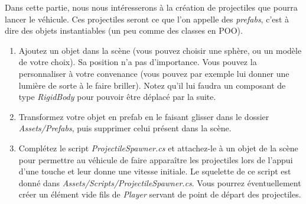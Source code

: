 Dans cette partie, nous nous intéresserons à la création de projectiles que pourra lancer le véhicule. Ces projectiles seront ce que l'on appelle des \textit{prefabs}, c'est à dire des objets instantiables (un peu comme des classes en POO).

\begin{enumerate}
\item Ajoutez un objet dans la scène (vous pouvez choisir une sphère, ou un modèle de votre choix). Sa position n'a pas d'importance. Vous pouvez la personnaliser à votre convenance (vous pouvez par exemple lui donner une lumière de sorte à le faire briller). Notez qu'il lui faudra un composant de type \textit{RigidBody} pour pouvoir être déplacé par la suite.
\item Transformez votre objet en prefab en le faisant glisser dans le dossier \textit{Assets/Prefabs}, puis supprimer celui présent dans la scène.
\item Complétez le script \textit{ProjectileSpawner.cs} et attachez-le à un objet de la scène pour permettre au véhicule de faire apparaître les projectiles lors de l'appui d'une touche et leur donne une vitesse initiale. Le squelette de ce script est donné dans \textit{Assets/Scripts/ProjectileSpawner.cs}. Vous pourrez éventuellement créer un élément vide fils de \textit{Player} servant de point de départ des projectiles.
\end{enumerate}